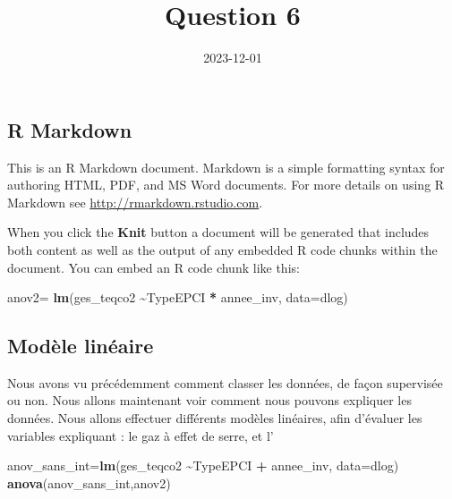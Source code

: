\documentclass[
]{article}
\title{Question 6}
\author{}
\date{\vspace{-2.5em}2023-12-01}
\newenvironment{Shaded}{\begin{snugshade}}{\end{snugshade}}
\newcommand{\AttributeTok}[1]{\textcolor[rgb]{0.13,0.29,0.53}{#1}}
\newcommand{\FunctionTok}[1]{\textcolor[rgb]{0.13,0.29,0.53}{\textbf{#1}}}
\newcommand{\NormalTok}[1]{#1}
\newcommand{\OtherTok}[1]{\textcolor[rgb]{0.56,0.35,0.01}{#1}}
\newcommand{\SpecialCharTok}[1]{\textcolor[rgb]{0.81,0.36,0.00}{\textbf{#1}}}
\begin{document}
\maketitle

\hypertarget{r-markdown}{%
\subsection{R Markdown}\label{r-markdown}}

This is an R Markdown document. Markdown is a simple formatting syntax
for authoring HTML, PDF, and MS Word documents. For more details on
using R Markdown see \url{http://rmarkdown.rstudio.com}.

When you click the \textbf{Knit} button a document will be generated
that includes both content as well as the output of any embedded R code
chunks within the document. You can embed an R code chunk like this:

\begin{Shaded}
\begin{Highlighting}[]
\NormalTok{anov2}\OtherTok{=} \FunctionTok{lm}\NormalTok{(ges\_teqco2 }\SpecialCharTok{\textasciitilde{}}\NormalTok{TypeEPCI }\SpecialCharTok{*}\NormalTok{ annee\_inv, }\AttributeTok{data=}\NormalTok{dlog)}
\end{Highlighting}
\end{Shaded}

\hypertarget{moduxe8le-linuxe9aire}{%
\subsection{Modèle linéaire}\label{moduxe8le-linuxe9aire}}

Nous avons vu précédemment comment classer les données, de façon
supervisée ou non. Nous allons maintenant voir comment nous pouvons
expliquer les données. Nous allons effectuer différents modèles
linéaires, afin d'évaluer les variables expliquant : le gaz à effet de
serre, et l'

\begin{Shaded}
\begin{Highlighting}[]
\NormalTok{anov\_sans\_int}\OtherTok{=}\FunctionTok{lm}\NormalTok{(ges\_teqco2 }\SpecialCharTok{\textasciitilde{}}\NormalTok{TypeEPCI }\SpecialCharTok{+}\NormalTok{ annee\_inv, }\AttributeTok{data=}\NormalTok{dlog)}
\FunctionTok{anova}\NormalTok{(anov\_sans\_int,anov2)}
\end{Highlighting}
\end{Shaded}
\end{document}
